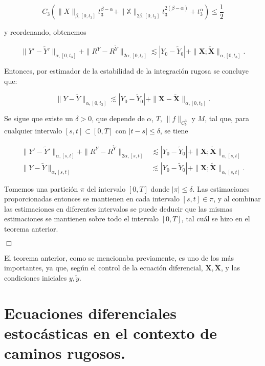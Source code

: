 \[
	C_3 \left( \| X \|_{\beta, [0,t_3]} t_3^{\beta - \alpha} + \| \mathbb{X} \|_{2\beta, [0,t_3]} t_3^{2(\beta - \alpha)} + t_3^{\alpha} \right) \leq \frac{1}{2}
\]

y reordenando, obtenemos

\[
\| Y' - \tilde{Y}' \|_{\alpha, [0,t_3]} + \| R^Y - R^{\tilde{Y}} \|_{2\alpha, [0,t_3]} \lesssim |Y_0 - \tilde{Y}_0| + \| \mathbf{X}; \tilde{\mathbf{X}} \|_{\alpha, [0,t_3]}.
\]

Entonces, por estimador de la estabilidad de la integración rugosa se concluye que:

\[
\| Y - \tilde{Y} \|_{\alpha, [0,t_3]} \lesssim |Y_0 - \tilde{Y}_0| + \| \mathbf{X} - \tilde{\mathbf{X}} \|_{\alpha, [0,t_3]}.
\]

Se sigue que existe un $\delta > 0$, que depende de $\alpha$, $T$, $\| f \|_{C_b^3}$ y $M$, tal que, para cualquier intervalo $[s,t] \subset [0,T]$ con $|t-s| \leq \delta$, se tiene

\begin{align}
\| Y' - \tilde{Y}' \|_{\alpha, [s,t]} + \| R^Y - R^{\tilde{Y}} \|_{2\alpha, [s,t]} &\lesssim |Y_0 - \tilde{Y}_0| + \| \mathbf{X} ; \tilde{\mathbf{X}} \|_{\alpha, [s,t]} \\ %
\| Y - \tilde{Y} \|_{\alpha, [s,t]} &\lesssim |Y_0 - \tilde{Y}_0| + \| \mathbf{X} ; \tilde{\mathbf{X}} \|_{\alpha, [s,t]}. %
\end{align}

Tomemos una partición $\pi$ del intervalo $[0,T]$ donde $|\pi| \leq \delta$. Las estimaciones proporcionadas entonces se mantienen en cada intervalo $[s,t] \in \pi$, y al combinar las estimaciones en diferentes intervalos se puede deducir que las mismas estimaciones se mantienen sobre todo el intervalo $[0,T]$, tal cuál se hizo en el teorema anterior.


\begin{flushright}
	$\Box$
\end{flushright}

El teorema anterior, como se mencionaba previamente, es uno de los más importantes, ya que, según el control de la ecuación diferencial, $\mathbf{X}, \mathbf{\tilde{X}}$, y las condiciones iniciales $y, \tilde{y}$.


\section{Ecuaciones diferenciales estocásticas en el contexto de caminos rugosos.}

